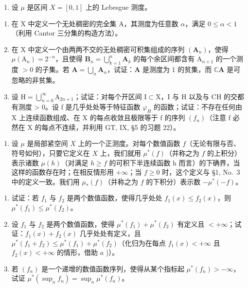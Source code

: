 \begin{enumerate}
\def\labelenumi{\arabic{enumi})}
\setcounter{enumi}{3}
\tightlist
\item
  设 \(\mu\) 是区间 \(X = [0,1]\) 上的 Lebesgue 测度。
\end{enumerate}

\begin{enumerate}
\def\labelenumi{\alph{enumi})}
\item
  在 X 中定义一个无处稠密的完全集 A，其测度为任意数 \(\alpha\)，满足 \(0 \leqslant \alpha < 1\)（利用 Cantor 三分集的构造方法）。
\item
  在 X 中定义一个由两两不交的无处稠密可积集组成的序列 \((\mathbf{A}_n)\)，使得 \(\mu (\mathrm{A}_n) = 2^{-n}\)，且使得 \(\mathbf{B}_n = \bigcup_{k = 1}^{n}\mathbf{A}_k\) 的每个余区间都含有 \(\mathrm{A}_{n + 1}\) 的一个测度 \(>0\) 的子集。若 \(\mathbf{A} = \bigcup_{n}\mathbf{A}_n\)，试证：\(\mathbf{A}\) 是测度为 1 的贫集，而 \(\mathbb{C}\mathbf{A}\) 是可忽略的非贫集。
\item
  设 \(\mathrm{H} = \bigcup_{n=0}^{\infty} \mathrm{A}_{2n+1}\)；试证：对每个开区间 \(\mathrm{I} \subset \mathrm{X}\)，I 与 H 以及与 CH 的交都有测度 \textgreater{} 0。设 f 是几乎处处等于特征函数 \(\varphi_{H}\) 的函数；试证：不存在任何由 X 上连续函数组成、在 X 的每点收敛且极限等于 f 的序列 \((f_{n})\)（注意 f 必然在 X 的每点不连续，并利用 GT, IX, §5 的习题 22）。
\end{enumerate}

\begin{enumerate}
\def\labelenumi{\arabic{enumi})}
\setcounter{enumi}{4}
\tightlist
\item
  设 \(\mu\) 是局部紧空间 \(X\) 上的一个正测度。对每个数值函数 \(f\)（无论有限与否、符号如何），只要它定义在 \(X\) 上，我们就用 \(\mu^{*}(f)\)（并称之为 \(f\) 的上积分）表示诸数 \(\mu(h)\)（对满足 \(h \geqslant f\) 的可积下半连续函数 h 而言）的下确界，当这样的函数存在时；在相反情形用 \(+\infty\)；当 \(f \geqslant 0\) 时，这个定义与 §1, No.~3 中的定义一致。我们用 \(\mu_{*}(f)\)（并称之为 \(f\) 的下积分）表示数 \(-\mu^{*}(-f)\)。
\end{enumerate}

\begin{enumerate}
\def\labelenumi{\alph{enumi})}
\item
  试证：若 \(f_{1}\) 与 \(f_{2}\) 是两个数值函数，使得几乎处处 \(f_{1}(x) \leqslant f_{2}(x)\)，则 \(\mu^{*}(f_{1}) \leqslant \mu^{*}(f_{2})\)。
\item
  设 \(f_{1}\) 与 \(f_{2}\) 是两个数值函数，使得 \(\mu^{*}(f_{1}) + \mu^{*}(f_{2})\) 有定义且 \(< +\infty\)；试证：\(f_{1}(x) + f_{2}(x)\) 几乎处处有定义，且 \(\mu^{*}(f_{1} + f_{2}) \leqslant \mu^{*}(f_{1}) + \mu^{*}(f_{2})\)（化归为在每点 \(f_{1}(x) < +\infty\) 且 \(f_{2}(x) < +\infty\) 的情形，借助 \(a\) )）。
\item
  若 \((f_n)\) 是一个递增的数值函数序列，使得从某个指标起 \(\mu^{*}(f_{n}) > -\infty\)，试证 \(\mu^{*}(\sup_{n} f_{n}) = \sup_{n} \mu^{*}(f_{n})\)。
\end{enumerate}

